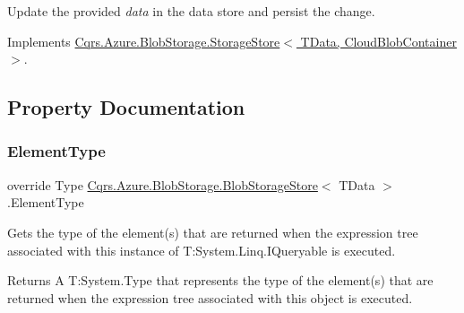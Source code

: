 Update the provided {\itshape data}  in the data store and persist the change. 



Implements \hyperlink{classCqrs_1_1Azure_1_1BlobStorage_1_1StorageStore_ae9ca8bfe30040f77e349a4d47b31da70_ae9ca8bfe30040f77e349a4d47b31da70}{Cqrs.\+Azure.\+Blob\+Storage.\+Storage\+Store$<$ T\+Data, Cloud\+Blob\+Container $>$}.



\subsection{Property Documentation}
\mbox{\label{classCqrs_1_1Azure_1_1BlobStorage_1_1BlobStorageStore_af4f4ed2c32ce521ebf164e63ef453b9c_af4f4ed2c32ce521ebf164e63ef453b9c}} 
\subsubsection{\texorpdfstring{Element\+Type}{ElementType}}
{\footnotesize\ttfamily override Type \hyperlink{classCqrs_1_1Azure_1_1BlobStorage_1_1BlobStorageStore}{Cqrs.\+Azure.\+Blob\+Storage.\+Blob\+Storage\+Store}$<$ T\+Data $>$.Element\+Type\hspace{0.3cm}{\ttfamily [get]}}



Gets the type of the element(s) that are returned when the expression tree associated with this instance of T\+:\+System.\+Linq.\+I\+Queryable is executed. 

\begin{DoxyReturn}{Returns}
A T\+:\+System.\+Type that represents the type of the element(s) that are returned when the expression tree associated with this object is executed. 
\end{DoxyReturn}
\mbox{\label{classCqrs_1_1Azure_1_1BlobStorage_1_1BlobStorageStore_a8b3be7237234e7de532fccbfa6bbade8_a8b3be7237234e7de532fccbfa6bbade8}} 
